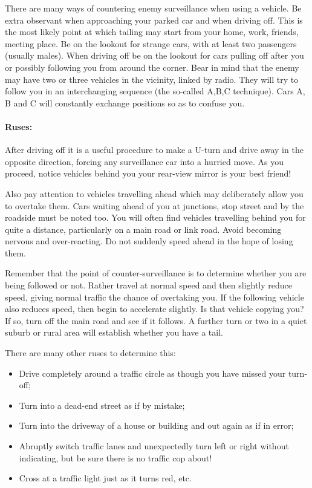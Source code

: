 There are many ways of countering enemy surveillance when using a
vehicle. Be extra observant when approaching your parked car and when
driving off. This is the most likely point at which tailing may start
from your home, work, friends, meeting place. Be on the lookout for
strange cars, with at least two passengers (usually males). When driving
off be on the lookout for cars pulling off after you or possibly
following you from around the corner. Bear in mind that the enemy may
have two or three vehicles in the vicinity, linked by radio. They will
try to follow you in an interchanging sequence (the so-called A,B,C
technique). Cars A, B and C will constantly exchange positions so as to
confuse you.

\paragraph{Ruses:}

After driving off it is a useful procedure to make a U-turn and drive
away in the opposite direction, forcing any surveillance car into a
hurried move. As you proceed, notice vehicles behind you your rear-view
mirror is your best friend!

Also pay attention to vehicles travelling ahead which may deliberately
allow you to overtake them. Cars waiting ahead of you at junctions, stop
street and by the roadside must be noted too. You will often find
vehicles travelling behind you for quite a distance, particularly on a
main road or link road. Avoid becoming nervous and over-reacting. Do not
suddenly speed ahead in the hope of losing them.

Remember that the point of counter-surveillance is to determine whether
you are being followed or not. Rather travel at normal speed and then
slightly reduce speed, giving normal traffic the chance of overtaking
you. If the following vehicle also reduces speed, then begin to
accelerate slightly. Is that vehicle copying you? If so, turn off the
main road and see if it follows. A further turn or two in a quiet suburb
or rural area will establish whether you have a tail.

There are many other ruses to determine this:

\begin{itemize}
\tightlist
\item
  Drive completely around a traffic circle as though you have missed
  your turn-off;
\item
  Turn into a dead-end street as if by mistake;
\item
  Turn into the driveway of a house or building and out again as if in
  error;
\item
  Abruptly switch traffic lanes and unexpectedly turn left or right
  without indicating, but be sure there is no traffic cop about!
\item
  Cross at a traffic light just as it turns red, etc.
\end{itemize}

